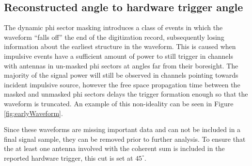 	
	\subsection{Reconstructed angle to hardware trigger angle}
		The dynamic phi sector masking introduces a class of events in which the waveform ``falls off'' the end of the digitization record, subsequently losing information about the earliest structure in the waveform.  This is caused when impulsive events have a sufficient amount of power to still trigger in channels with antennas in un-masked phi sectors at angles far from their boresight.  The majority of the signal power will still be observed in channels pointing towards incident impulsive source, however the free space propagation time between the masked and unmasked phi sectors delays the trigger formation enough so that the waveform is truncated.  An example of this non-ideality can be seen in Figure \ref{fig:earlyWaveform}.
		
		Since these waveforms are missing important data and can not be included in a final signal sample, they can be removed prior to further analysis.  To ensure that the at least one antenna involved with the coherent sum is included in the reported hardware trigger, this cut is set at $45^\circ$.
		
